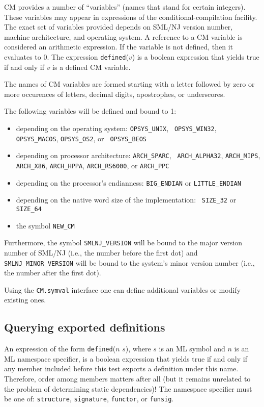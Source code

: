 \documentclass{article}
\begin{document}
CM provides a number of ``variables'' (names that stand for certain
integers). These variables may appear in expressions of the
conditional-compilation facility. The exact set of variables provided
depends on SML/NJ version number, machine architecture, and
operating system.  A reference to a CM variable is considered an
arithmetic expression. If the variable is not defined, then it
evaluates to 0.  The expression {\tt defined}($v$) is a boolean
expression that yields true if and only if $v$ is a defined CM
variable.

The names of CM variables are formed starting with a letter followed
by zero or more occurences of letters, decimal digits, apostrophes, or
underscores.

The following variables will be defined and bound to 1:
\begin{itemize}
\item depending on the operating system: {\tt OPSYS\_UNIX}, {\tt
OPSYS\_WIN32}, {\tt OPSYS\_MACOS}, {\tt OPSYS\_OS2}, or {\tt
OPSYS\_BEOS}
\item depending on processor architecture: {\tt ARCH\_SPARC}, {\tt
ARCH\_ALPHA32}, {\tt ARCH\_MIPS}, {\tt ARCH\_X86}, {\tt ARCH\_HPPA},
{\tt ARCH\_RS6000}, or {\tt ARCH\_PPC}
\item depending on the processor's endianness: {\tt BIG\_ENDIAN} or
{\tt LITTLE\_ENDIAN}
\item depending on the native word size of the implementation: {\tt
SIZE\_32} or {\tt SIZE\_64}
\item the symbol {\tt NEW\_CM}
\end{itemize}

Furthermore, the symbol {\tt SMLNJ\_VERSION} will be bound to the
major version number of SML/NJ (i.e., the number before the first dot)
and {\tt SMLNJ\_MINOR\_VERSION} will be bound to the system's minor
version number (i.e., the number after the first dot).

Using the {\tt CM.symval} interface one can define additional
variables or modify existing ones.

\subsection{Querying exported definitions}

An expression of the form {\tt defined}($n$ $s$), where $s$ is an ML
symbol and $n$ is an ML namespace specifier, is a boolean expression
that yields true if and only if any member included before this test
exports a definition under this name.  Therefore, order among members
matters after all (but it remains unrelated to the problem of
determining static dependencies)!  The namespace specifier must be one
of: {\tt structure}, {\tt signature}, {\tt functor}, or {\tt funsig}.
\end{document}
